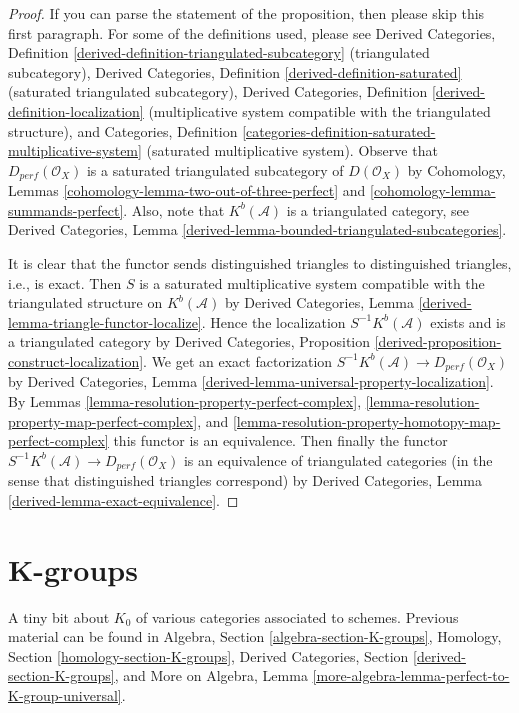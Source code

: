 \documentclass{stacks-project}
\theoremstyle{plain}
\theoremstyle{definition}
\theoremstyle{remark}
\numberwithin{equation}{subsection}
\begin{document}
\begin{proof}
If you can parse the statement of the proposition, then please skip this
first paragraph. For some of the definitions used, please see
Derived Categories, Definition
\ref{derived-definition-triangulated-subcategory}
(triangulated subcategory),
Derived Categories, Definition \ref{derived-definition-saturated}
(saturated triangulated subcategory),
Derived Categories, Definition \ref{derived-definition-localization}
(multiplicative system compatible with the triangulated structure), and
Categories,
Definition \ref{categories-definition-saturated-multiplicative-system}
(saturated multiplicative system).
Observe that $D_{perf}(\mathcal{O}_X)$ is a saturated triangulated subcategory
of $D(\mathcal{O}_X)$ by
Cohomology, Lemmas \ref{cohomology-lemma-two-out-of-three-perfect} and
\ref{cohomology-lemma-summands-perfect}. Also, note that
$K^b(\mathcal{A})$ is a triangulated category, see
Derived Categories, Lemma
\ref{derived-lemma-bounded-triangulated-subcategories}.

\medskip\noindent
It is clear that the functor sends distinguished triangles to
distinguished triangles, i.e., is exact. Then $S$ is a saturated
multiplicative system compatible with the triangulated structure
on $K^b(\mathcal{A})$ by
Derived Categories, Lemma \ref{derived-lemma-triangle-functor-localize}.
Hence the localization $S^{-1}K^b(\mathcal{A})$ exists and is
a triangulated category by
Derived Categories, Proposition
\ref{derived-proposition-construct-localization}.
We get an exact factorization
$S^{-1}K^b(\mathcal{A}) \to D_{perf}(\mathcal{O}_X)$ by
Derived Categories, Lemma
\ref{derived-lemma-universal-property-localization}.
By Lemmas \ref{lemma-resolution-property-perfect-complex},
\ref{lemma-resolution-property-map-perfect-complex}, and
\ref{lemma-resolution-property-homotopy-map-perfect-complex}
this functor is an equivalence. Then finally the functor
$S^{-1}K^b(\mathcal{A}) \to D_{perf}(\mathcal{O}_X)$
is an equivalence of triangulated categories (in the sense that
distinguished triangles correspond) by
Derived Categories, Lemma \ref{derived-lemma-exact-equivalence}.
\end{proof}






\section{K-groups}
\label{section-K-groups}

\noindent
A tiny bit about $K_0$ of various categories associated to schemes.
Previous material can be found in
Algebra, Section \ref{algebra-section-K-groups},
Homology, Section \ref{homology-section-K-groups},
Derived Categories, Section \ref{derived-section-K-groups}, and
More on Algebra, Lemma \ref{more-algebra-lemma-perfect-to-K-group-universal}.
\end{document}
